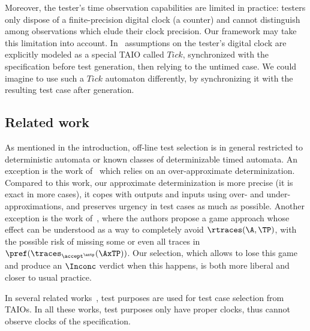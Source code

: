 \documentclass{LMCS}
\theoremstyle{plain}\newtheorem{proposition}[thm]{Proposition}
\begin{document}
Moreover, the tester's time observation capabilities are limited in
practice: testers only dispose of a finite-precision digital clock (a
counter) and cannot distinguish among observations which elude their
clock precision.  Our framework may take this limitation into account.
In~\cite{KrichenTripakis09} assumptions on the tester's digital clock
are explicitly modeled as a special TAIO called $Tick$, synchronized
with the specification before test generation, then relying to the
untimed case.  We could imagine to use such a $Tick$ automaton
differently, by synchronizing it with the resulting test case after
generation.



\subsection*{Related work}
As mentioned in the introduction, off-line test selection is in
general restricted to deterministic automata or known classes of
determinizable timed automata.  An exception is the work
of~\cite{KrichenTripakis09} which relies on an over-approximate
determinization.  Compared to this work, our approximate
determinization is more precise (it is exact in more cases), it copes
with outputs and inputs using over- and under-approximations, and
preserves urgency in test cases as much as possible.  Another
exception is the work of~\cite{DavidLarsenLiNielsen-ICST09}, where the
authors propose a game approach whose effect can be understood as a
way to completely avoid $\rtraces(\A,\TP)$, with the possible risk of
missing some or even all traces in
$\pref(\traces_{\accept^\axtp}(\AxTP))$.  Our selection, which allows
to lose this game and produce an $\Inconc$ verdict when this happens,
is both more liberal and closer to usual practice.


In several related
works~\cite{KoneCastanetLaurencot-IC3N98,EnNouaryDssouli-Testcom2001},
test purposes are used for test case selection from TAIOs.  In all
these works, test purposes only have proper clocks, thus cannot
observe clocks of the
specification. 
\end{document}
